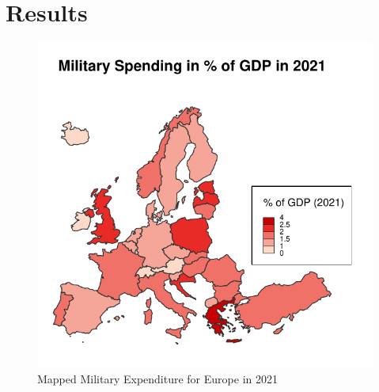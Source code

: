\documentclass[12pt,a4paper]{article}
\begin{document}
\clearpage
\section{Results}
\begin{figure}[h]
\center
\label{F:1}
\includegraphics[scale=0.75]{Map1.pdf}
\caption{Mapped Military Expenditure for Europe in 2021}
\end{figure}
\clearpage
\end{document}
